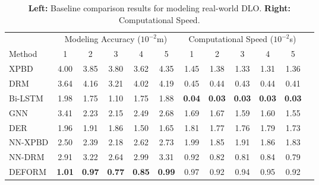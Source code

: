 \vspace*{-6pt}

\begin{table}[h]
    \centering
    \caption{\textbf{Left:} Baseline comparison results for modeling real-world DLO. \textbf{Right:} Computational Speed.}
    \begin{tabular}{l|ccccc|cccccc}
        \toprule
        & \multicolumn{5}{c|}{Modeling Accuracy ($10^{-2}$m)} & \multicolumn{5}{c}{Computational Speed ($10^{-2}$s)} \\         
        Method & 1 & 2 & 3 & 4 & 5 & 1 & 2 & 3 & 4 & 5 \\
        \midrule
        XPBD\cite{xpbd} & 4.00  & 3.85 & 3.80 & 3.62 & 4.35 & 1.45 & 1.38 & 1.33 & 1.31 & 1.36\\ 
        DRM\cite{directionalrigidity} & 3.64 & 4.16 & 3.21 & 4.02 & 4.19 & 0.45 & 0.44 & 0.43 & 0.44 & 0.41\\ 
        Bi-LSTM\cite{bi-LSTM_baseline} & 1.98 & 1.75 & 1.10 & 1.75 & 1.88 & \textbf{0.04} & \textbf{0.03} & \textbf{0.03} & \textbf{0.03} & \textbf{0.03}\\ 
        GNN\cite{GNN_baseline} & 3.41 & 2.23 &2.15 & 2.49 & 2.68 &  1.69 & 1.67 & 1.59 & 1.60 & 1.55\\
        DER\cite{originalDER} & 1.96 & 1.91 & 1.86 & 1.50 & 1.65 & 1.81 & 1.77 & 1.76 & 1.79 & 1.73\\ 
        NN-XPBD & 2.50 &  2.39  & 2.18 & 2.62 & 2.73 & 1.99 & 1.85 & 1.91 & 1.86 & 1.83\\ 
        NN-DRM & 2.91 & 3.22& 2.64  & 2.99 &  3.31 & 0.92 & 0.82 & 0.81 & 0.84 & 0.79 \\
        DEFORM & \textbf{1.01} & \textbf{0.97} & \textbf{0.77} & \textbf{0.85} & \textbf{0.99} & 0.97 & 0.92 & 0.94 & 0.95 & 0.92\\
        \bottomrule
    \end{tabular}
    \label{tab:model accuracy and computational speed}
        \vspace*{-2pt}

\end{table}



